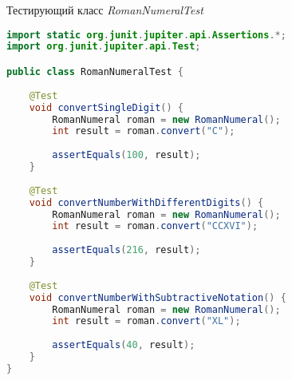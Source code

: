 \begin{ListingEnv}[!h]%
	\captiondelim{ } %
	\caption{Тестирующий класс \textit{RomanNumeralTest}}
	\begin{lstlisting}[language={Java}]
import static org.junit.jupiter.api.Assertions.*;
import org.junit.jupiter.api.Test;

public class RomanNumeralTest {
	
	@Test
	void convertSingleDigit() {
		RomanNumeral roman = new RomanNumeral();
		int result = roman.convert("C");
		
		assertEquals(100, result);
	}
	
	@Test
	void convertNumberWithDifferentDigits() {
		RomanNumeral roman = new RomanNumeral();
		int result = roman.convert("CCXVI");
		
		assertEquals(216, result);
	}
	
	@Test
	void convertNumberWithSubtractiveNotation() {
		RomanNumeral roman = new RomanNumeral();
		int result = roman.convert("XL");
		
		assertEquals(40, result);
	}
}
	\end{lstlisting}
\end{ListingEnv}

